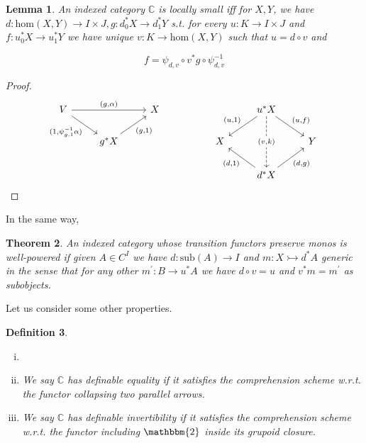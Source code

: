 \documentclass[10pt, oneside]{article}
\newtheorem{theorem}{Theorem}[section]
\newtheorem{definition}[theorem]{Definition}
\newtheorem{lemma}[theorem]{Lemma}
\begin{document}
\begin{lemma}
    An indexed category $\mathbb{C}$ is locally small iff for $X, Y$, we have $d: \mathrm{hom}(X, Y) \to I \times J, g: d_0^\ast X \to d_1^\ast Y$ s.t. for every $u: K \to I \times J$ and $f: u_0^\ast X \to u_1^\ast Y$ we have unique $v: K \to \mathrm{hom}(X, Y)$ such that $u = d \circ v$ and
    
    $$ f = \psi_{d, v} \circ v^\ast g \circ \psi_{d, v}^{-1} $$
\end{lemma}
\begin{proof}
    \[\begin{tikzcd}[ampersand replacement=\&]
	V \&\& X \&\&\& {u^\ast X} \\
	\& {g^\ast X} \&\&\& X \&\& Y \\
	\&\&\&\&\& {d^\ast X}
	\arrow["{(g, \alpha)}", from=1-1, to=1-3]
	\arrow["{(1, \psi_{g, 1}^{-1} \alpha)}"', from=1-1, to=2-2]
	\arrow["{(g, 1)}"', from=2-2, to=1-3]
	\arrow["{(d, 1)}", from=3-6, to=2-5]
	\arrow["{(u,1)}"', from=1-6, to=2-5]
	\arrow["{(v, k)}"{description}, dashed, from=1-6, to=3-6]
	\arrow["{(u, f)}", from=1-6, to=2-7]
	\arrow["{(d, g)}"', from=3-6, to=2-7]
\end{tikzcd}\]
\end{proof}

In the same way,

\begin{theorem}
    An indexed category whose transition functors preserve monos is well-powered if given $A \in C^I$ we have $d: \mathrm{sub}(A) \to I$ and $m: X \rightarrowtail d^\ast A$ generic in the sense that for any other $m^\prime: B \to u^\ast A$ we have $d \circ v = u$ and $v^\ast m = m^\prime$ as subobjects.
\end{theorem}

Let us consider some other properties.

\begin{definition}
    \begin{enumerate}[i)]

    \item[]
    
        \item We say $\mathbb{C}$ has definable equality if it satisfies the comprehension scheme w.r.t. the functor collapsing two parallel arrows.

        \item We say $\mathbb{C}$ has definable invertibility if it satisfies the comprehension scheme w.r.t. the functor including $\mathbbm{2}$ inside its grupoid closure.
    \end{enumerate}
\end{definition}
\end{document}
